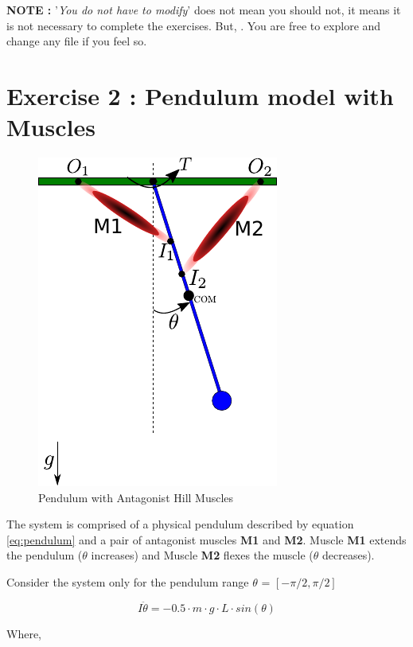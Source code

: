 \documentclass{cmc}
\begin{document}
\textbf{NOTE : } '\textit{You do not have to modify}' does not mean
you should not, it means it is not necessary to complete the
exercises. But, . You are free to explore
and change any file if you feel so.

\section*{Exercise 2 : Pendulum model with Muscles}
\label{sec:question-1}

\begin{figure}[H]
  \centering \includegraphics[scale=1.0]{figures/pendulum_muscles.pdf}
  \caption{Pendulum with Antagonist Hill Muscles}
  \label{fig:p_muscles}
\end{figure}

The system is comprised of a physical pendulum described by equation
\ref{eq:pendulum} and a pair of antagonist muscles \textbf{M1} and
\textbf{M2}. Muscle \textbf{M1} extends the pendulum ($\theta$
increases) and Muscle \textbf{M2} flexes the muscle ($\theta$
decreases).

Consider the system only for the pendulum range $\theta$ =
$[-\pi/2, \pi/2]$

\begin{equation}
  \label{eq:pendulum}
  I\ddot{\theta} = -0.5 \cdot m \cdot g \cdot L \cdot sin(\theta)
\end{equation}

Where,
\end{document}
